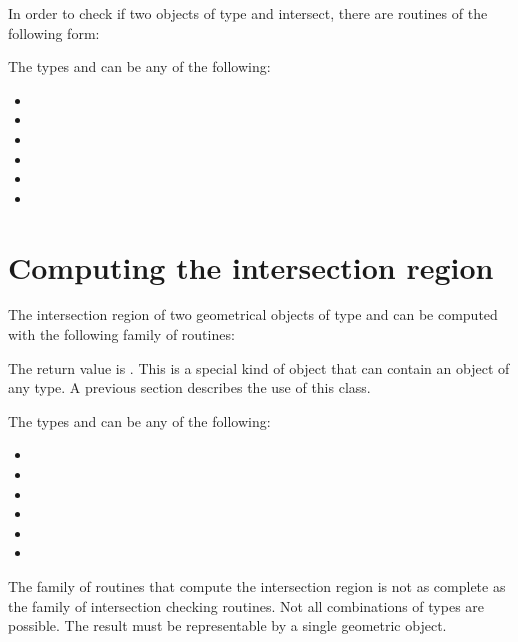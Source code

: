 In order to check if two objects of type  and 
intersect, there are routines of the following form:



The types  and  can be any of the
following:
\begin{itemize}
\item {}
\item {}
\item {}
\item {}
\item {}
\item {}
\end{itemize}



\section{Computing the intersection region}


The intersection region of two geometrical objects of type 
and  can be computed with the following family of routines:


The return value is . This is a special kind of object
that can contain an object of any type.
A previous section
describes the use of this class.

The types  and  can be any of the
following:
\begin{itemize}
\item {}
\item {}
\item {}
\item {}
\item {}
\item {}
\end{itemize}

The family of routines that compute the intersection region is not as complete
as the family of intersection checking routines.
Not all combinations of types are possible.
The result must be representable by a single geometric object.


